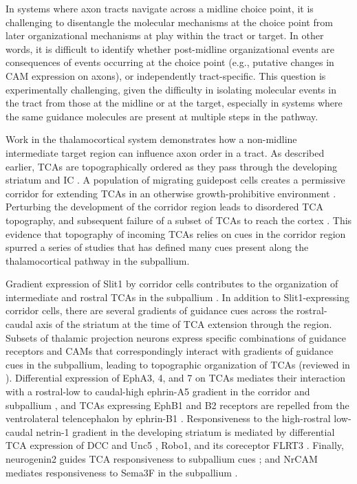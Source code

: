 In systems where axon tracts navigate across a midline choice point, it is challenging to disentangle the molecular mechanisms at the choice point from later organizational mechanisms at play within the tract or target.
In other words, it is difficult to identify whether post-midline organizational events are consequences of events occurring at the choice point (e.g., putative changes in CAM expression on axons), or independently tract-specific.
This question is experimentally challenging, given the difficulty in isolating molecular events in the tract from those at the midline or at the target, especially in systems where the same guidance molecules are present at multiple steps in the pathway. 

Work in the thalamocortical system demonstrates how a non-midline intermediate target region can influence axon order in a tract. 
As described earlier, TCAs are topographically ordered as they pass through the developing striatum and IC \cite{garel2014inputs}.
A population of migrating guidepost cells creates a permissive corridor for extending TCAs in an otherwise growth-prohibitive environment \cite{bielle2011emergent,lopez2006tangential}. 
Perturbing the development of the corridor region leads to disordered TCA topography, and subsequent failure of a subset of TCAs to reach the cortex \cite{garel2002early}. 
This evidence that topography of incoming TCAs relies on cues in the corridor region spurred a series of studies that has defined many cues present along the thalamocortical pathway in the subpallium. 

Gradient expression of Slit1 by corridor cells contributes to the organization of intermediate and rostral TCAs in the subpallium \cite{bielle2011emergent}. 
In addition to Slit1-expressing corridor cells, there are several gradients of guidance cues across the rostral-caudal axis of the striatum at the time of TCA extension through the region. 
Subsets of thalamic projection neurons express specific combinations of guidance receptors and CAMs that correspondingly interact with gradients of guidance cues in the subpallium, leading to topographic organization of TCAs (reviewed in \cite{garel2014inputs,molnar2012mechanisms}). 
Differential expression of EphA3, 4, and 7 on TCAs mediates their interaction with a rostral-low to caudal-high ephrin-A5 gradient in the corridor and subpallium \cite{dufour2003area}, and TCAs expressing EphB1 and B2 receptors are repelled from the ventrolateral telencephalon by ephrin-B1 \cite{robichaux2014ephb}.
Responsiveness to the high-rostral low-caudal netrin-1 gradient in the developing striatum is mediated by differential TCA expression of DCC and Unc5 \cite{powell2008topography}, Robo1, and its coreceptor FLRT3 \cite{leyva2014flrt3}.
Finally, neurogenin2 guides TCA responsiveness to subpallium cues \cite{seibt2003neurogenin2}; and NrCAM mediates responsiveness to Sema3F in the subpallium \cite{demyanenko2011nrcam}. 

